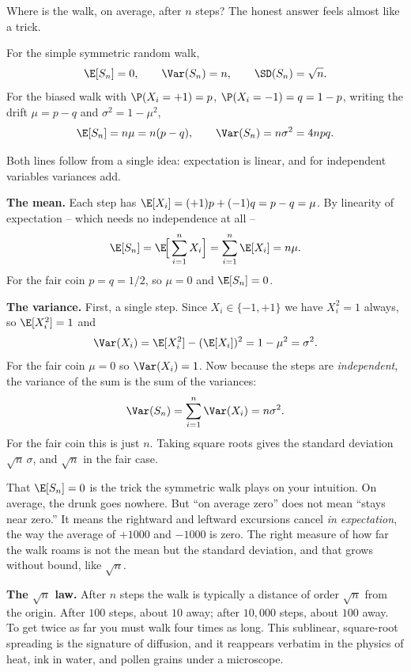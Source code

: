 Where is the walk, on average, after $n$ steps? The honest answer feels almost
like a trick.

\begin{theorem}
\label{ch26:thm-meanvar}
For the simple symmetric random walk,
\[
  \E[S_n] = 0, \qquad \Var(S_n) = n, \qquad \SD(S_n) = \sqrt{n}.
\]
For the biased walk with $\P(X_i = +1) = p$, $\P(X_i = -1) = q = 1-p$, writing
the drift $\mu = p - q$ and $\sigma^2 = 1 - \mu^2$,
\[
  \E[S_n] = n\mu = n(p-q), \qquad \Var(S_n) = n\sigma^2 = 4npq.
\]
\end{theorem}

\begin{whybox}
Both lines follow from a single idea: expectation is linear, and for
independent variables variances add.

\textbf{The mean.} Each step has $\E[X_i] = (+1)p + (-1)q = p - q = \mu$. By
linearity of expectation -- which needs no independence at all --
\[
  \E[S_n] = \E\!\Big[\sum_{i=1}^n X_i\Big] = \sum_{i=1}^n \E[X_i] = n\mu.
\]
For the fair coin $p = q = 1/2$, so $\mu = 0$ and $\E[S_n] = 0$.

\textbf{The variance.} First, a single step. Since $X_i \in \{-1,+1\}$ we
have $X_i^2 = 1$ always, so $\E[X_i^2] = 1$ and
\[
  \Var(X_i) = \E[X_i^2] - (\E[X_i])^2 = 1 - \mu^2 = \sigma^2.
\]
For the fair coin $\mu = 0$ so $\Var(X_i) = 1$. Now because the steps are
\emph{independent}, the variance of the sum is the sum of the variances:
\[
  \Var(S_n) = \sum_{i=1}^n \Var(X_i) = n\sigma^2.
\]
For the fair coin this is just $n$. Taking square roots gives the standard
deviation $\sqrt{n}\,\sigma$, and $\sqrt{n}$ in the fair case.
\end{whybox}

That $\E[S_n] = 0$ is the trick the symmetric walk plays on your intuition. On
average, the drunk goes nowhere. But ``on average zero'' does not mean ``stays
near zero.'' It means the rightward and leftward excursions cancel \emph{in
expectation}, the way the average of $+1000$ and $-1000$ is zero. The right
measure of how far the walk roams is not the mean but the standard deviation,
and that grows without bound, like $\sqrt{n}$.

\begin{focusbox}
\textbf{The $\sqrt{n}$ law.} After $n$ steps the walk is typically a distance
of order $\sqrt{n}$ from the origin. After $100$ steps, about $10$ away; after
$10{,}000$ steps, about $100$ away. To get twice as far you must walk four
times as long. This sublinear, square-root spreading is the signature of
diffusion, and it reappears verbatim in the physics of heat, ink in water, and
pollen grains under a microscope.
\end{focusbox}

